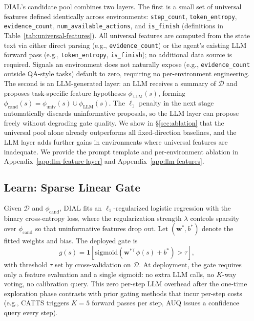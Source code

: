 DIAL's candidate pool combines two layers. The first is a small set of universal features defined identically across environments: \texttt{step\_count}, \texttt{token\_entropy}, \texttt{evidence\_count}, \texttt{num\_available\_actions}, and \texttt{is\_finish} (definitions in Table~\ref{tab:universal-features}). All universal features are computed from the state text via either direct parsing (e.g., \texttt{evidence\_count}) or the agent's existing LLM forward pass (e.g., \texttt{token\_entropy}, \texttt{is\_finish}); no additional data source is required. Signals an environment does not naturally expose (e.g., \texttt{evidence\_count} outside QA-style tasks) default to zero, requiring no per-environment engineering. The second is an LLM-generated layer: an LLM receives a summary of $\mathcal{D}$ and proposes task-specific feature hypotheses $\phi_{\text{LLM}}(s)$, forming $\phi_{\text{cand}}(s) = \phi_{\text{univ}}(s) \cup \phi_{\text{LLM}}(s)$. The $\ell_1$ penalty in the next stage automatically discards uninformative proposals, so the LLM layer can propose freely without degrading gate quality. We show in \S\ref{sec:ablation} that the universal pool alone already outperforms all fixed-direction baselines, and the LLM layer adds further gains in environments where universal features are inadequate. We provide the prompt template and per-environment ablation in Appendix~\ref{app:llm-feature-layer} and Appendix~\ref{app:llm-features}.

\vspace{-0.15in}
\subsection{Learn: Sparse Linear Gate}
\label{sec:learn}
\vspace{-0.05in}

Given $\mathcal{D}$ and $\phi_{\text{cand}}$, DIAL fits an $\ell_1$-regularized logistic regression with the binary cross-entropy loss, where the regularization strength $\lambda$ controls sparsity over $\phi_{\text{cand}}$ so that uninformative features drop out. Let $(\mathbf{w}^*, b^*)$ denote the fitted weights and bias. The deployed gate is
\begin{equation}
  g(s) = \mathbf{1}\!\left[\mathrm{sigmoid}(\mathbf{w}^{*\top} \phi(s) + b^*) > \tau\right],
  \label{eq:gate}
\end{equation}
with threshold $\tau$ set by cross-validation on $\mathcal{D}$. At deployment, the gate requires only a feature evaluation and a single sigmoid: no extra LLM calls, no $K$-way voting, no calibration query. This zero per-step LLM overhead after the one-time exploration phase contrasts with prior gating methods that incur per-step costs (e.g., CATTS triggers $K{=}5$ forward passes per step, AUQ issues a confidence query every step).

